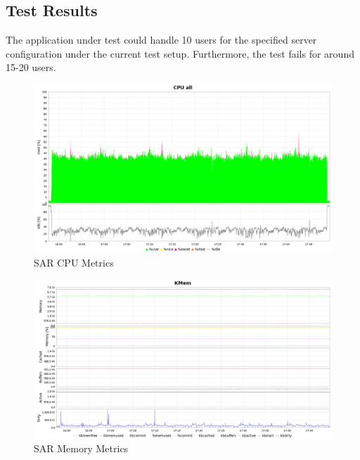 \documentclass[12pt]{article}
\begin{document}
\subsection*{Test Results}
The application under test could handle 10 users for the specified server configuration under the current test setup. Furthermore, the test fails for around 15-20 users.
\clearpage
\begin{figure}[h!]
	\centering
	\includegraphics[width=\textwidth,height=\textheight,keepaspectratio]{intro/cpu_harshit.png}
	\caption{SAR CPU Metrics}
\end{figure}
\begin{figure}[h!]
	\centering
	\includegraphics[width=\textwidth,height=\textheight,keepaspectratio]{intro/mem_harshit.png}
	\caption{SAR Memory Metrics}
\end{figure}
\end{document}
